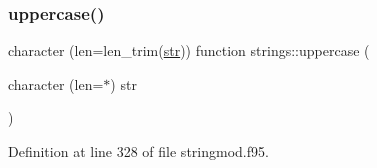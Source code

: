\subsubsection{\texorpdfstring{uppercase()}{uppercase()}}
{\footnotesize\ttfamily character (len=len\+\_\+trim(\hyperlink{_s_o_l_w_e_i_g__misc_8f95_a77a2ca74046c88062aa8333bf1eaca05}{str})) function strings\+::uppercase (\begin{DoxyParamCaption}\item[{character (len=$\ast$)}]{str }\end{DoxyParamCaption})}



Definition at line 328 of file stringmod.\+f95.

